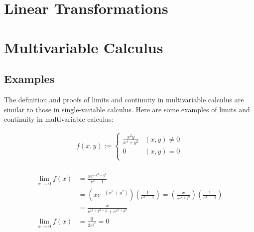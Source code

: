 \documentclass{article}
\begin{document}
\section{Linear Transformations}

\section{Multivariable Calculus}

\subsection{Examples}

The definition and proofs of limits and continuity in multivariable calculus are similar to those in single-variable calculus. Here are some examples of limits and continuity in multivariable calculus:

\begin{align}
    f(x,y) := 
    \begin{cases}
    \frac{x^2 y}{x^4 + y^2} & (x,y) \neq 0 \\
    0 & (x,y) = 0 \\
    \end{cases} \\
\end{align}

\begin{align}
    \lim_{x\to0} f(x) &= \frac{xe^{-x^{2}-y^{2}}}{e^x - 1} \\
    &= (xe^{-(x^2+y^2)})(\frac{1}{e^x - 1}) = (\frac{x}{e^{x^2+y^2}})(\frac{1}{e^x - 1}) \\
    &= \frac{x}{e^{x^2+y^2+x} + e^{x^2+y^2}} \\
    \lim_{x\to0} f(x) &=\frac{0}{2e^{y^2}} = 0\\ 
\end{align}
\end{document}
